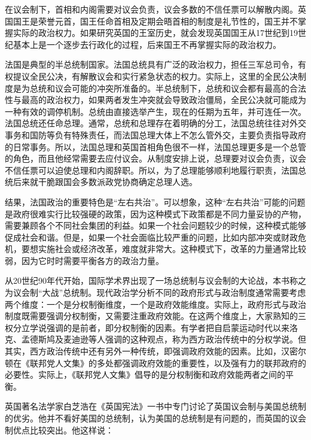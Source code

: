 在议会制下，首相和内阁需要对议会负责，议会多数的不信任票可以解散内阁。英国国王是荣誉元首，国王任命首相及定期会晤首相的制度是礼节性的，国王并不掌握实际的政治权力。如果研究英国的王室历史，就会发现英国国王从17世纪到19世纪基本上是一个逐步去行政化的过程，后来国王不再掌握实际的政治权力。

法国是典型的半总统制国家。法国总统具有广泛的政治权力，担任三军总司令，有权提议全民公决，有解散议会和实行紧急状态的权力。实际上，这里的全民公决制度是为总统和议会可能的冲突所准备的。半总统制下，总统和议会都有最高的合法性与最高的政治权力，如果两者发生冲突就会导致政治僵局，全民公决就可能成为一种有效的调停机制。总统由直接选举产生，现在的任期为五年，并可连任一次。法国总统还任命总理。通常，总统和总理存在着明确的分工，法国总统往往对外交事务和国防等负有特殊责任，而法国总理大体上不怎么管外交，主要负责指导政府的日常事务。所以，法国总理和英国首相角色很不一样，法国总理更多是一个总管的角色，而且他经常需要去应付议会。从制度安排上说，总理要对议会负责，议会不信任票可以迫使总理和内阁辞职。所以，为了总理能够顺利地履行职责，法国总统后来就干脆跟国会多数派政党协商确定总理人选。

结果，法国政治的重要特色是“左右共治”。可以想象，这种“左右共治”可能的问题是政府很难实行比较强硬的政策，因为这种模式下政策都是不同力量妥协的产物，需要兼顾各个不同社会集团的利益。如果一个社会问题较少的时候，这种模式能够促成社会和谐。但是，如果一个社会面临比较严重的问题，比如内部冲突或财政危机，要想实施社会或经济改革，难度就非常大。这种模式下，改革的力量通常比较弱，因为它时时需要平衡各方的政治力量。


从20世纪90年代开始，国际学术界出现了一场总统制与议会制的大论战，本书称之为议会制“大战”总统制。现代政治学分析不同的政府形式与政治制度通常需要考虑两个维度：一个是分权制衡维度，一个是政府效能维度。实际上，政府形式与政治制度既需要强调分权制衡，又需要注重政府效能。在这两个维度上，大家熟知的三权分立学说强调的是前者，即分权制衡的因素。有学者把自启蒙运动时代以来洛克、孟德斯鸠及麦迪逊等人强调的这种观点，称为西方政治传统中的分权学说。但其实，西方政治传统中还有另外一种传统，即强调政府效能的因素。比如，汉密尔顿在《联邦党人文集》的多处都强调政府效能的重要性，以及强有力的联邦政府的必要性。实际上，《联邦党人文集》倡导的是分权制衡和政府效能两者之间的平衡。

英国著名法学家白芝浩在《英国宪法》一书中专门讨论了英国议会制与美国总统制的优劣。他并不看好美国的总统制，认为美国的总统制是有问题的，而英国的议会制优点比较突出。他这样说：


